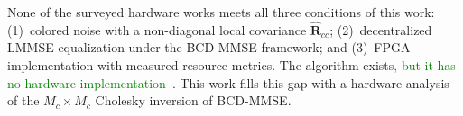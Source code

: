
None of the surveyed hardware works meets all three conditions of this work: (1)~colored noise
with a non-diagonal local covariance $\hat{\mathbf{R}}_{cc}$;
(2)~decentralized LMMSE equalization under the BCD-MMSE framework; and
(3)~FPGA implementation with measured resource metrics. The algorithm exists\textcolor{GREEN}{, but it has no hardware implementation}~\cite{zhao2025jsac}. This work fills this gap with a hardware analysis of the $M_c \times M_c$ Cholesky inversion of BCD-MMSE.
